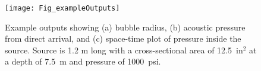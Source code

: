\documentclass[10pt]{article}
\begin{document}
\begin{figure}[h]
\centering
\texttt{[image: Fig\_exampleOutputs]}
\caption{Example outputs showing (a) bubble radius, (b) acoustic pressure from direct arrival, and (c) space-time plot of pressure inside the source. Source is 1.2 m long with a cross-sectional area of 12.5~in$^2$ at a depth of 7.5~m and pressure of 1000~psi.}
\label{fig:example outputs}
\end{figure}




\newpage


\end{document}
